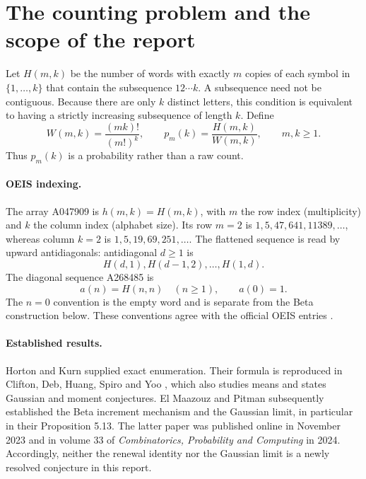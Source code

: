 \documentclass[11pt]{article}
\numberwithin{equation}{section}
\theoremstyle{remark}\newtheorem{remark}[theorem]{Remark}
\begin{document}
\section{The counting problem and the scope of the report}

Let $H(m,k)$ be the number of words with exactly $m$ copies of each symbol
in $\{1,\ldots,k\}$ that contain the subsequence $12\cdots k$.  A subsequence
need not be contiguous.  Because there are only $k$ distinct letters, this
condition is equivalent to having a strictly increasing subsequence of
length $k$.  Define
\begin{equation}\label{brs:eq:definition}
 W(m,k)=\frac{(mk)!}{(m!)^k},\qquad p_m(k)=\frac{H(m,k)}{W(m,k)},\qquad m,k\geq1.
\end{equation}
Thus $p_m(k)$ is a probability rather than a raw count.

\paragraph{OEIS indexing.}
The array A047909 is $h(m,k)=H(m,k)$, with $m$ the row index (multiplicity)
and $k$ the column index (alphabet size).  Its row $m=2$ is
$1,5,47,641,11389,\ldots$, whereas column $k=2$ is
$1,5,19,69,251,\ldots$.  The flattened sequence is read by upward
antidiagonals: antidiagonal $d\geq1$ is
\[
 H(d,1),H(d-1,2),\ldots,H(1,d).
\]
The diagonal sequence A268485 is
\begin{equation}\label{brs:eq:diagonaldef}
 a(n)=H(n,n)\quad(n\geq1),\qquad a(0)=1.
\end{equation}
The $n=0$ convention is the empty word and is separate from the Beta
construction below.  These conventions agree with the official OEIS
entries \cite{oeisarray,oeisdiag}.

\paragraph{Established results.}
Horton and Kurn \cite{horton} supplied exact enumeration.  Their formula
is reproduced in Clifton, Deb, Huang, Spiro and Yoo \cite{clifton}, which
also studies means and states Gaussian and moment conjectures.
El Maazouz and Pitman \cite{clock} subsequently established the Beta
increment mechanism and the Gaussian limit, in particular in their
Proposition 5.13.  The latter paper was published online in November 2023
and in volume 33 of \emph{Combinatorics, Probability and Computing} in
2024.  Accordingly, neither the renewal identity nor the Gaussian limit
is a newly resolved conjecture in this report.
\end{document}
